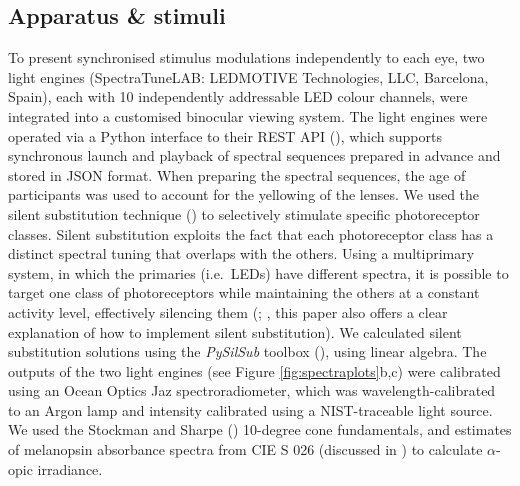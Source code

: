\documentclass[
]{article}
\begin{document}
\subsection{Apparatus \& stimuli}\label{apparatus-stimuli}

To present synchronised stimulus modulations independently to each eye, two light engines (SpectraTuneLAB: LEDMOTIVE Technologies, LLC, Barcelona, Spain), each with 10 independently addressable LED colour channels, were integrated into a customised binocular viewing system. The light engines were operated via a Python interface to their REST API (), which supports synchronous launch and playback of spectral sequences prepared in advance and stored in JSON format. When preparing the spectral sequences, the age of participants was used to account for the yellowing of the lenses. We used the silent substitution technique () to selectively stimulate specific photoreceptor classes. Silent substitution exploits the fact that each photoreceptor class has a distinct spectral tuning that overlaps with the others. Using a multiprimary system, in which the primaries (i.e.~LEDs) have different spectra, it is possible to target one class of photoreceptors while maintaining the others at a constant activity level, effectively silencing them (; , this paper also offers a clear explanation of how to implement silent substitution). We calculated silent substitution solutions using the \emph{PySilSub} toolbox (), using linear algebra. The outputs of the two light engines (see Figure \ref{fig:spectraplots}b,c) were calibrated using an Ocean Optics Jaz spectroradiometer, which was wavelength-calibrated to an Argon lamp and intensity calibrated using a NIST-traceable light source. We used the Stockman and Sharpe () 10-degree cone fundamentals, and estimates of melanopsin absorbance spectra from CIE S 026 (discussed in ) to calculate \(\alpha\)-opic irradiance.
\end{document}
